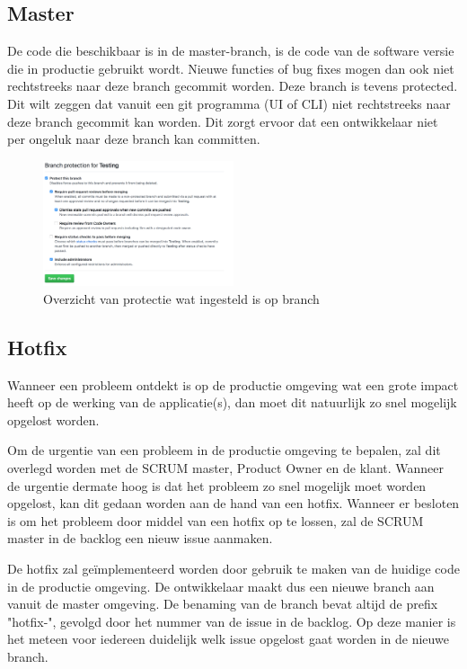 	\subsection{Master}
	De code die beschikbaar is in de master-branch, is de code van de software versie die in productie gebruikt wordt. Nieuwe functies of bug fixes mogen dan ook niet rechtstreeks naar deze branch gecommit worden.
	Deze branch is tevens protected. Dit wilt zeggen dat vanuit een git programma (UI of CLI) niet rechtstreeks naar deze branch gecommit kan worden. Dit zorgt ervoor dat een ontwikkelaar niet per ongeluk naar deze branch kan committen.
	
	
	\begin{figure}[H]
	\includegraphics[width=0.5\textwidth]{images/BranchProtectionSetup.png}
	\caption{Overzicht van protectie wat ingesteld is op branch}
	\label{fig:BranchProtectionSetup}
	\end{figure}

	\subsection{Hotfix}
	Wanneer een probleem ontdekt is op de productie omgeving wat een grote impact heeft op de werking van de applicatie(s), dan moet dit natuurlijk zo snel mogelijk opgelost worden. 
	
	Om de urgentie van een probleem in de productie omgeving te bepalen, zal dit overlegd worden met de SCRUM master, Product Owner en de klant. Wanneer de urgentie dermate hoog is dat het probleem zo snel mogelijk moet worden opgelost, kan dit gedaan worden aan de hand van een hotfix.
	Wanneer er besloten is om het probleem door middel van een hotfix op te lossen, zal de SCRUM master in de backlog een nieuw issue aanmaken.
	
	De hotfix zal geïmplementeerd worden door gebruik te maken van de huidige code in de productie omgeving. De ontwikkelaar maakt dus een nieuwe branch aan vanuit de master omgeving. De benaming van de branch bevat altijd de prefix "hotfix-", gevolgd door het nummer van de issue in de backlog. Op deze manier is het meteen voor iedereen duidelijk welk issue opgelost gaat worden in de nieuwe branch.
	
